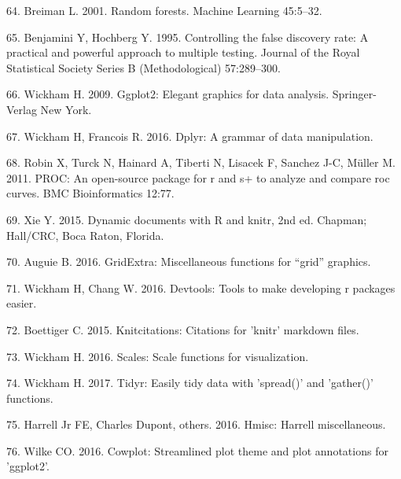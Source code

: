 \documentclass[12pt,]{article}
\begin{document}
\hypertarget{ref-breiman_rf_2001}{}
64. Breiman L. 2001. Random forests. Machine Learning 45:5--32.

\hypertarget{ref-Benjamini_Hochberg_1995}{}
65. Benjamini Y, Hochberg Y. 1995. Controlling the false discovery rate:
A practical and powerful approach to multiple testing. Journal of the
Royal Statistical Society Series B (Methodological) 57:289--300.

\hypertarget{ref-ggplot2}{}
66. Wickham H. 2009. Ggplot2: Elegant graphics for data analysis.
Springer-Verlag New York.

\hypertarget{ref-dplyr}{}
67. Wickham H, Francois R. 2016. Dplyr: A grammar of data manipulation.

\hypertarget{ref-pROC}{}
68. Robin X, Turck N, Hainard A, Tiberti N, Lisacek F, Sanchez J-C,
Müller M. 2011. PROC: An open-source package for r and s+ to analyze and
compare roc curves. BMC Bioinformatics 12:77.

\hypertarget{ref-knitr2015}{}
69. Xie Y. 2015. Dynamic documents with R and knitr, 2nd ed. Chapman;
Hall/CRC, Boca Raton, Florida.

\hypertarget{ref-gridExtra}{}
70. Auguie B. 2016. GridExtra: Miscellaneous functions for ``grid''
graphics.

\hypertarget{ref-devtools}{}
71. Wickham H, Chang W. 2016. Devtools: Tools to make developing r
packages easier.

\hypertarget{ref-knitcitations}{}
72. Boettiger C. 2015. Knitcitations: Citations for 'knitr' markdown
files.

\hypertarget{ref-scales}{}
73. Wickham H. 2016. Scales: Scale functions for visualization.

\hypertarget{ref-tidyr}{}
74. Wickham H. 2017. Tidyr: Easily tidy data with 'spread()' and
'gather()' functions.

\hypertarget{ref-Hmisc}{}
75. Harrell Jr FE, Charles Dupont, others. 2016. Hmisc: Harrell
miscellaneous.

\hypertarget{ref-cowplot}{}
76. Wilke CO. 2016. Cowplot: Streamlined plot theme and plot annotations
for 'ggplot2'.
\end{document}
